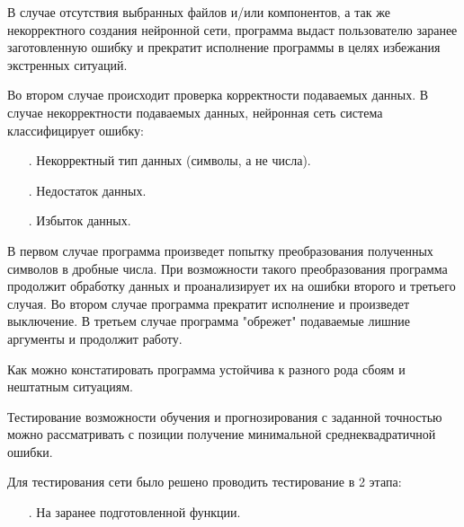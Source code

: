 {	\par \redline В случае отсутствия выбранных файлов и/или компонентов, а так же некорректного создания нейронной сети, программа выдаст пользователю заранее заготовленную ошибку и прекратит исполнение программы в целях избежания экстренных ситуаций.
	
	
	\par \redline Во втором случае происходит проверка корректности подаваемых данных. В случае некорректности подаваемых данных, нейронная сеть система классифицирует ошибку:  
	
	\begin{itemize}[leftmargin=2.15cm, labelwidth=0.65cm, labelsep=0.0cm] 
		
		\item[\theitemcntr. ]  Некорректный тип данных (символы, а не числа).
		\addtocounter{itemcntr}{1}
		
		\item[\theitemcntr. ] Недостаток данных.
		\addtocounter{itemcntr}{1}
		
		\item[\theitemcntr. ] Избыток данных.
		\addtocounter{itemcntr}{1}
		
		\setcounter{itemcntr}{1}
	\end{itemize}  
	
	\par \redline В первом случае программа произведет попытку преобразования полученных символов в дробные числа. При возможности такого преобразования программа продолжит обработку данных и проанализирует их на ошибки второго и третьего случая. Во втором случае программа прекратит исполнение и произведет выключение. В третьем случае программа "обрежет" \spc подаваемые лишние аргументы и продолжит работу.
	
	\par \redline Как можно констатировать программа устойчива к разного рода сбоям и нештатным ситуациям.
	
	\par \redline Тестирование возможности обучения и прогнозирования с заданной точностью \newline можно рассматривать с позиции получение минимальной среднеквадратичной ошибки. 
	
	\par \redline Для тестирования сети было решено проводить тестирование в 2 этапа: 
	
	\begin{itemize}[leftmargin=2.15cm, labelwidth=0.65cm, labelsep=0.0cm] 		
		\item[\theitemcntr. ]  На заранее подготовленной функции.
		\addtocounter{itemcntr}{1}
		

\end{itemize}}
